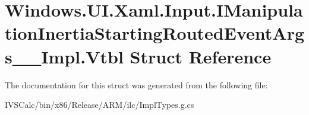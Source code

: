 \hypertarget{struct_windows_1_1_u_i_1_1_xaml_1_1_input_1_1_i_manipulation_inertia_starting_routed_event_args_____impl_1_1_vtbl}{}\section{Windows.\+U\+I.\+Xaml.\+Input.\+I\+Manipulation\+Inertia\+Starting\+Routed\+Event\+Args\+\_\+\+\_\+\+Impl.\+Vtbl Struct Reference}
\label{struct_windows_1_1_u_i_1_1_xaml_1_1_input_1_1_i_manipulation_inertia_starting_routed_event_args_____impl_1_1_vtbl}


The documentation for this struct was generated from the following file\+:\begin{DoxyCompactItemize}
\item 
I\+V\+S\+Calc/bin/x86/\+Release/\+A\+R\+M/ilc/Impl\+Types.\+g.\+cs\end{DoxyCompactItemize}
